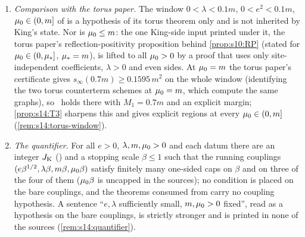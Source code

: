 \begin{lemma}
\begin{enumerate}[label=\textup{(\alph*)},leftmargin=*]
\item \emph{Comparison with the torus paper.} The window $0<\lambda<0.1m$, $0<e^2<0.1m$, $\mu_0\in(0,m]$ of \cite{SymPhase} is a hypothesis of its torus theorem only and is not inherited by King's state. Nor is $\mu_0\le m$: the one King-side input printed under it, the torus paper's reflection-positivity proposition behind \cref{prop:s10:RP} (stated for $\mu_0\in(0,\mu_*]$, $\mu_*=m$), is lifted to all $\mu_0>0$ by a proof that uses only site-independent coefficients, $\lambda>0$ and even sides. At $\mu_0=m$ the torus paper's certificate gives $s_\infty(0.7m)\ge0.1595\,m^2$ on the whole window (identifying the two torus counterterm schemes at $\mu_0=m$, which compute the same graphs), so \Tthree\ holds there with $M_1=0.7m$ and an explicit margin; \cref{prop:s14:T3} sharpens this and gives explicit regions at every $\mu_0\in(0,m]$ (\cref{rem:s14:torus-window}).
\item \emph{The quantifier.} For all $e>0$, $\lambda,m,\mu_0>0$ and each datum there are an integer $J_{\rm K}$ (\cite[Thm.~3.1]{K1}) and a stopping scale $\beta\le1$ such that the running couplings $(e\beta^{1/2},\lambda\beta,m\beta,\mu_0\beta)$ satisfy finitely many one-sided caps on $\beta$ and on three of the four of them ($\mu_0\beta$ is uncapped in the sources); no condition is placed on the bare couplings, and the theorems consumed from \cite{K1,K2} carry no coupling hypothesis. A sentence ``$e,\lambda$ sufficiently small, $m,\mu_0>0$ fixed'', read as a hypothesis on the bare couplings, is strictly stronger and is printed in none of the sources (\cref{rem:s14:quantifier}).
\end{enumerate}
\end{lemma}


